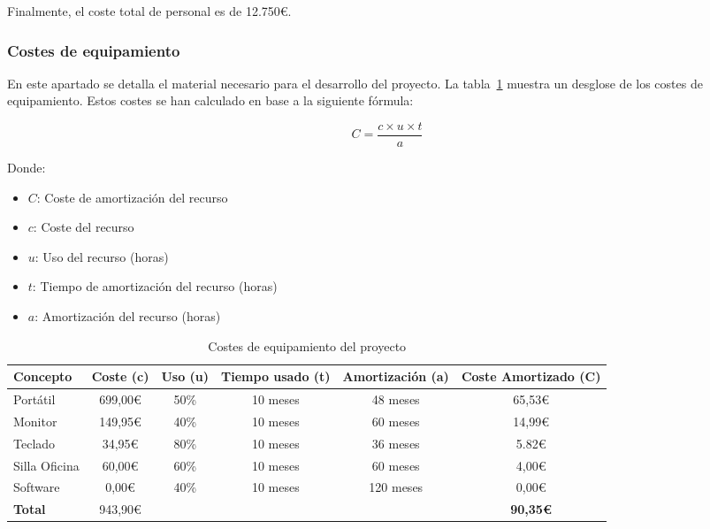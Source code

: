 Finalmente, el coste total de personal es de 12.750\euro.

\subsubsection{Costes de equipamiento}
En este apartado se detalla el material necesario para el desarrollo del proyecto. La tabla~\ref{tab:material} muestra un desglose de los costes de equipamiento. Estos costes se han calculado en base a la siguiente fórmula:

\[C = \frac{c\times u\times t}{a}\]

Donde:
\begin{itemize}
    \item $C$: Coste de amortización del recurso
    \item $c$: Coste del recurso
    \item $u$: Uso del recurso (horas)
    \item $t$: Tiempo de amortización del recurso (horas)
    \item $a$: Amortización del recurso (horas)
\end{itemize}


\begin{table}[H]
    \begin{adjustbox}{max width=\textwidth}
    \centering
    \begin{tabular}{@{}lccccc@{}}
    \toprule
    \textbf{Concepto} & \multicolumn{1}{l}{\textbf{Coste (c)}} & \multicolumn{1}{l}{\textbf{Uso (u)}} & \multicolumn{1}{l}{\textbf{Tiempo usado (t)}} & \multicolumn{1}{l}{\textbf{Amortización (a)}} & \multicolumn{1}{l}{\textbf{Coste Amortizado (C)}} \\ \midrule
 Portátil       & 699,00\euro  & 50\%   & 10 meses     & 48 meses     & 65,53\euro     \\
 Monitor        & 149,95\euro  & 40\%   & 10 meses     & 60 meses     & 14,99\euro     \\
 Teclado        & 34,95\euro   & 80\%   & 10 meses     & 36 meses     & 5.82\euro   \\
 Silla Oficina  & 60,00\euro   & 60\%   & 10 meses     & 60 meses     & 4,00\euro   \\
 Software       & 0,00\euro    & 40\%   & 10 meses     & 120 meses    & 0,00\euro   \\ \midrule
 \textbf{Total} & 943,90\euro  &        &              &              & \textbf{90,35\euro}    \\ \bottomrule
    \end{tabular}
    \end{adjustbox}
    \caption{Costes de equipamiento del proyecto}\label{tab:material}
\end{table}


